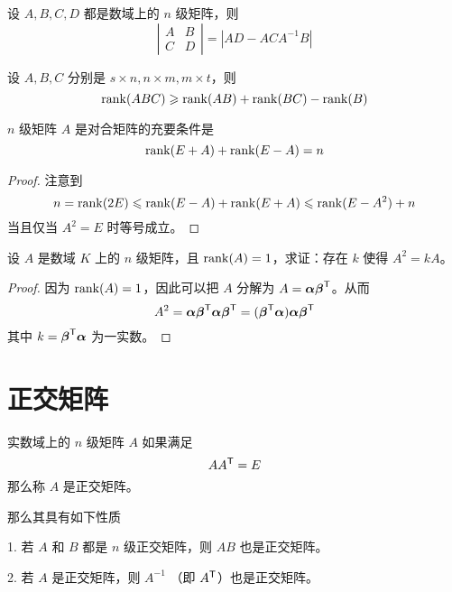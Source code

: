 \begin{example}
	设 $A, B, C, D$ 都是数域上的 $n$ 级矩阵，则
	\[ \left| \begin{matrix}
			A & B \\ C & D
		\end{matrix} \right| = |AD - ACA^{-1}B| \]
\end{example}

\begin{theorem}
	设 $A, B, C$ 分别是 $s \times n, n \times m, m \times t$，则
	\[ \operatorname{rank}(ABC) \geqslant \operatorname{rank}(AB) + \operatorname{rank}(BC) - \operatorname{rank}(B) \]
\end{theorem}

\begin{theorem}
	$n$ 级矩阵 $A$ 是对合矩阵的充要条件是
	\[ \operatorname{rank}(E + A) + \operatorname{rank}(E - A) = n \]
\end{theorem}

\begin{proof}
	注意到
	\[ n = \operatorname{rank}(2E) \leqslant \operatorname{rank}(E - A) + \operatorname{rank}(E + A) \leqslant \operatorname{rank}(E - A^2) + n \]
	当且仅当 $A^2 = E$ 时等号成立。
\end{proof}

\begin{example}
	设 $A$ 是数域 $K$ 上的 $n$ 级矩阵，且 $\operatorname{rank}(A) = 1$，求证：存在 $k$ 使得 $A^2 = kA$。
\end{example}

\begin{proof}
	因为 $\operatorname{rank}(A) = 1$，因此可以把 $A$ 分解为 $A = \boldsymbol{\alpha}{\boldsymbol{\beta}}^\mathsf{T}$。从而
	\[ A^2 = \boldsymbol{\alpha}{\boldsymbol{\beta}}^\mathsf{T}\boldsymbol{\alpha}{\boldsymbol{\beta}}^\mathsf{T} = ({\boldsymbol{\beta}}^\mathsf{T}\boldsymbol{\alpha})\boldsymbol{\alpha}{\boldsymbol{\beta}}^\mathsf{T} \]
	其中 $k = {\boldsymbol{\beta}}^\mathsf{T}\boldsymbol{\alpha}$ 为一实数。
\end{proof}



\section{正交矩阵}

\begin{definition}
	实数域上的 $n$ 级矩阵 $A$ 如果满足
	\[A{A}^\mathsf{T}=E\]
	那么称 $A$ 是正交矩阵。
\end{definition}

那么其具有如下性质

1. 若 $A$ 和  $B$ 都是 $n$ 级正交矩阵，则 $AB$ 也是正交矩阵。

2. 若 $A$ 是正交矩阵，则 $A^{-1}$ （即 ${A}^\mathsf{T}$）也是正交矩阵。

